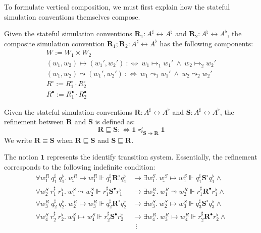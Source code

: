 \documentclass[acmsmall,screen,review,anonymous]{acmart}
\newcommand{\que}{\circ}
\newcommand{\ans}{\bullet}
\renewcommand{\preceq}{\preccurlyeq}
\newcommand{\intl}[1]{\underline{#1}}
\begin{document}
To formulate vertical composition, we must first explain how
the stateful simulation conventions themselves compose.

\begin{definition} \label{def:sccomp}
Given the stateful simulation conventions
$\mathbf{R}_1 : A^\sharp \leftrightarrow A^\natural$ and
$\mathbf{R}_2 : A^\natural \leftrightarrow A^\flat$,
the composite simulation convention
$\mathbf{R}_1 \mathbin; \mathbf{R}_2 : A^\sharp \leftrightarrow A^\flat$
has the following components:
\begin{gather*}
  W := W_1 \times W_2 \\
  (w_1, w_2) \mapsto (w_1', w_2') \: :\Leftrightarrow \:
    w_1 \mapsto_1 w_1' \: \wedge \:
    w_2 \mapsto_2 w_2' \\
  (w_1, w_2) \leadsto (w_1', w_2') \: :\Leftrightarrow \:
    w_1 \leadsto_1 w_1' \: \wedge \:
    w_2 \leadsto_2 w_2' \\
  R^\que := R_1^\que \cdot R_2^\que \\
  R^\ans := R_1^\ans \cdot R_2^\ans
\end{gather*}
\end{definition}

\begin{definition}  \label{def:scref}
  Given the stateful simulation conventions
  $\mathbf{R} : A^\sharp \leftrightarrow A^\flat$ and
  $\mathbf{S} : A^\sharp \leftrightarrow A^\flat$,
  the refinement between $\mathbf{R}$ and $\mathbf{S}$ is defined as:
  \[
    \mathbf{R} \sqsubseteq \mathbf{S} :\Leftrightarrow
    \mathbf{1} \preceq_{\mathbf{S} \twoheadrightarrow \mathbf{R}} \mathbf{1}
  \]
We write $\mathbf{R} \equiv \mathbf{S}$ when
$\mathbf{R} \sqsubseteq \mathbf{S}$ and
$\mathbf{S} \sqsubseteq \mathbf{R}$.
\end{definition}

The notion $\mathbf{1}$ represents the identify transition system.
Essentially, the refinement corresponds to the following indefinite condition:
\begin{align*}
  \forall w^R_1\ q^\sharp_1\ q^\flat_1.\ \intl{w^R} \mapsto w^R_1
  \Vdash q^\sharp_1 \mathrel{\mathbf{R}^\que} q^\flat_1 &\rightarrow
  \exists w^S_1.\ \intl{w^S} \mapsto w^S_1 
  \Vdash q^\sharp_1 \mathrel{\mathbf{S}^\que} q^\flat_1 \wedge\\
  \forall w^S_2\ r^\sharp_1\ r^\flat_1.\ w^S_1 \leadsto w^S_2
  \Vdash r^\sharp_1 \mathrel{\mathbf{S}^\ans} r^\flat_1 &\rightarrow
  \exists w^R_2.\ w^R_1 \leadsto w^R_2
  \Vdash r^\sharp_1 \mathrel{\mathbf{R}^\ans} r^\flat_1 \wedge\\
  \forall w^R_3\ q^\sharp_2\ q^\flat_2.\ w^R_2 \mapsto w^R_3
  \Vdash q^\sharp_2 \mathrel{\mathbf{R}^\que} q^\flat_2 &\rightarrow
  \exists w^S_3.\ w^S_2 \mapsto w^S_3
  \Vdash q^\sharp_3 \mathrel{\mathbf{S}^\que} q^\flat_3 \wedge\\
  \forall w^S_4\ r^\sharp_2\ r^\flat_2.\ w^S_3 \mapsto w^S_4
  \Vdash r^\sharp_2 \mathrel{\mathbf{S}^\ans} r^\flat_2 &\rightarrow
  \exists w^R_4.\ w^R_3 \mapsto w^R_4
  \Vdash r^\sharp_2 \mathrel{\mathbf{R}^\ans} r^\flat_2 \wedge\\[-1ex]
  &\:\:\vdots
\end{align*}
\end{document}
